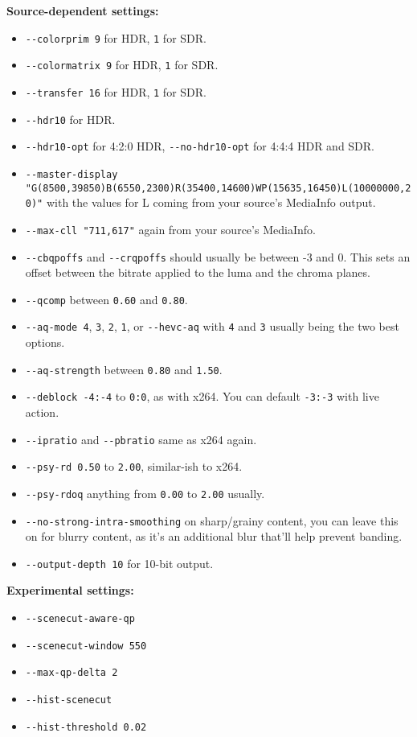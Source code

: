 \documentclass{scrartcl}
\begin{document}
\textbf{Source-dependent settings:}
\begin{itemize}
\item \texttt{-{}-colorprim 9} for HDR, \texttt{1} for SDR.
\item \texttt{-{}-colormatrix 9} for HDR, \texttt{1} for SDR.
\item \texttt{-{}-transfer 16} for HDR, \texttt{1} for SDR.
\item \texttt{-{}-hdr10} for HDR.
\item \texttt{-{}-hdr10-opt} for 4:2:0 HDR, \texttt{-{}-no-hdr10-opt} for 4:4:4 HDR and SDR.
\item \texttt{-{}-master-display\\ "G(8500,39850)B(6550,2300)R(35400,14600)WP(15635,16450)L(10000000,20)"} with the values for L coming from your source's MediaInfo output.
\item \texttt{-{}-max-cll "711,617"} again from your source's MediaInfo.
\item \texttt{-{}-cbqpoffs} and \texttt{-{}-crqpoffs} should usually be between -3 and 0.  This sets an offset between the bitrate applied to the luma and the chroma planes.
\item \texttt{-{}-qcomp} between \texttt{0.60} and \texttt{0.80}.
\item \texttt{-{}-aq-mode 4}, \texttt{3}, \texttt{2}, \texttt{1}, or \texttt{-{}-hevc-aq} with \texttt{4} and \texttt{3} usually being the two best options.
\item \texttt{-{}-aq-strength} between \texttt{0.80} and \texttt{1.50}.
\item \texttt{-{}-deblock -4:-4} to \texttt{0:0}, as with x264.  You can default \texttt{-3:-3} with live action.
\item \texttt{-{}-ipratio} and \texttt{-{}-pbratio} same as x264 again.
\item \texttt{-{}-psy-rd 0.50} to \texttt{2.00}, similar-ish to x264.
\item \texttt{-{}-psy-rdoq} anything from \texttt{0.00} to \texttt{2.00} usually.
\item \texttt{-{}-no-strong-intra-smoothing} on sharp/grainy content, you can leave this on for blurry content, as it's an additional blur that'll help prevent banding.
\item \texttt{-{}-output-depth 10} for 10-bit output.
\end{itemize}
\textbf{Experimental settings:}
\begin{itemize}
\item \texttt{-{}-scenecut-aware-qp}
\item \texttt{-{}-scenecut-window 550}
\item \texttt{-{}-max-qp-delta 2}
\item \texttt{-{}-hist-scenecut}
\item \texttt{-{}-hist-threshold 0.02}
\end{itemize}
\end{document}
